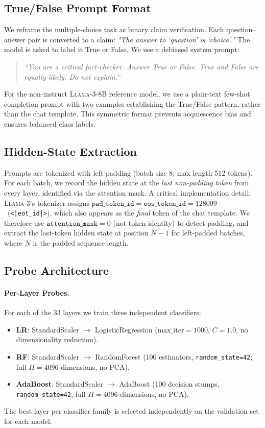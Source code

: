 \subsection{True/False Prompt Format}

We reframe the multiple-choice task as binary claim verification.
Each question--answer pair is converted to a claim: \emph{"The answer to
`\textlangle question\textrangle' is `\textlangle choice\textrangle'."\/}
The model is asked to label it True or False.
We use a debiased system prompt:
\begin{quote}
    \emph{``You are a critical fact-checker. Answer True or False.
    True and False are equally likely. Do not explain.''}
\end{quote}
For the non-instruct \textsc{Llama-3-8B} reference model, we use a plain-text
few-shot completion prompt with two examples establishing the True/False pattern,
rather than the chat template.
This symmetric format prevents acquiescence bias and ensures balanced class labels.

\subsection{Hidden-State Extraction}

Prompts are tokenized with left-padding (batch size 8, max length 512 tokens).
For each batch, we record the hidden state at the \emph{last non-padding token}
from every layer, identified via the attention mask.
A critical implementation detail: \textsc{Llama-3}'s tokenizer assigns
$\texttt{pad\_token\_id} = \texttt{eos\_token\_id} = 128009$~(\texttt{<|eot\_id|>}),
which also appears as the \emph{final} token of the chat template.
We therefore use $\texttt{attention\_mask} = 0$ (not token identity) to detect
padding, and extract the last-token hidden state at position $N-1$ for
left-padded batches, where $N$ is the padded sequence length.

\subsection{Probe Architecture}
\label{sec:probe-arch}

\paragraph{Per-Layer Probes.}
For each of the 33 layers we train three independent classifiers:
\begin{itemize}[leftmargin=1.5em, itemsep=2pt]
    \item \textbf{LR}: StandardScaler $\to$ LogisticRegression
          ($\text{max\_iter}=1000$, $C=1.0$, no dimensionality reduction).
    \item \textbf{RF}: StandardScaler $\to$
          RandomForest (100 estimators, \texttt{random\_state=42}; full $H{=}4096$ dimensions, no PCA).
    \item \textbf{AdaBoost}: StandardScaler $\to$
          AdaBoost (100 decision stumps, \texttt{random\_state=42}; full $H{=}4096$ dimensions, no PCA).
\end{itemize}
The best layer per classifier family is selected independently on the validation
set for each model.

